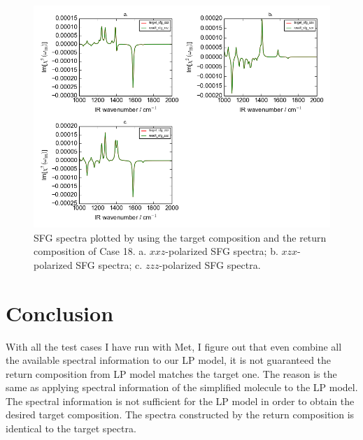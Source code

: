 \begin{figure}[!ht] 
\centering
\includegraphics[scale=0.7]{Figures/chapter4_result_target_plotting_500datapoint_sfg_version2.png}
\caption{SFG spectra plotted by using the target composition and the return composition of Case 18. a. $xxz$-polarized SFG spectra; b. $xzx$-polarized SFG spectra; c. $zzz$-polarized SFG spectra.} \label{fig:4.7}
\end{figure} 

\section{Conclusion}
With all the test cases I have run with Met, I figure out that even combine all the available spectral information to our LP model, it is not guaranteed the return composition from LP model matches the target one. The reason is the same as applying spectral information of the simplified molecule to the LP model. The spectral information is not sufficient for the LP model in order to obtain the desired target composition. The spectra constructed by the return composition is identical to the target spectra. 








